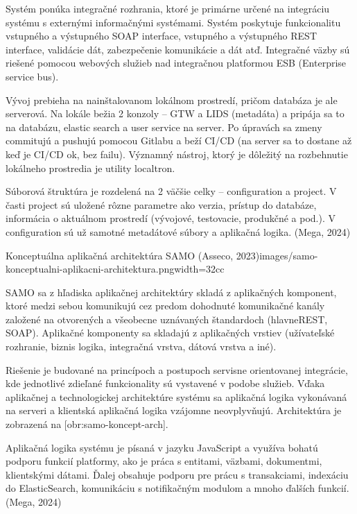 Systém ponúka integračné rozhrania, ktoré je primárne určené na integráciu systému s externými informačnými systémami. Systém poskytuje funkcionalitu vstupného a výstupného SOAP interface, vstupného a výstupného REST interface, validácie dát, zabezpečenie komunikácie a dát atď. Integračné väzby sú riešené pomocou webových služieb nad integračnou platformou ESB (Enterprise service bus). 

Vývoj prebieha na nainštalovanom lokálnom prostredí, pričom databáza je ale serverová. Na lokále bežia 2 konzoly -- GTW a LIDS (metadáta) a pripája sa to na databázu, elastic search a user service na server. Po úpravách sa zmeny commitujú a pushujú pomocou Gitlabu a beží CI/CD (na server sa to dostane až keď je CI/CD ok, bez failu). Významný nástroj, ktorý je dôležitý na rozbehnutie lokálneho prostredia je utility localtron. 

Súborová štruktúra je rozdelená na 2 väčšie celky -- configuration a project. V časti project sú uložené rôzne parametre ako verzia, prístup do databáze, informácia o aktuálnom prostredí (vývojové, testovacie, produkčné a pod.). V configuration sú už samotné metadátové súbory a aplikačná logika. (Mega, 2024)

{Konceptuálna aplikačná architektúra SAMO (Asseco, 2023)}{images/samo-konceptualni-aplikacni-architektura.png}{width=32cc}

SAMO sa z hľadiska aplikačnej architektúry skladá z aplikačných komponent, ktoré medzi sebou komunikujú cez predom dohodnuté komunikačné kanály založené na otvorených a všeobecne uznávaných štandardoch (hlavne\zlom REST, SOAP). Aplikačné komponenty sa skladajú z aplikačných vrstiev (užívateľské rozhranie, biznis logika, integračná vrstva, dátová vrstva a iné).

Riešenie je budované na princípoch a postupoch servisne orientovanej integrácie, kde jednotlivé zdieľané funkcionality sú vystavené v podobe služieb. Vďaka aplikačnej a technologickej architektúre systému sa aplikačná logika vykonávaná na serveri a klientská aplikačná logika vzájomne neovplyvňujú. Architektúra je zobrazená na [obr:samo-koncept-arch].

Aplikačná logika systému je písaná v jazyku JavaScript a využíva bohatú podporu funkcií platformy, ako je práca s entitami, väzbami, dokumentmi, klientskými dátami. Ďalej obsahuje podporu pre prácu s transakciami, indexáciu do ElasticSearch, komunikáciu s notifikačným modulom a mnoho ďalších funkcií. \scr(Mega, 2024)


